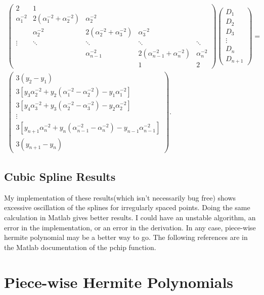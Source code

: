 \documentclass{scrartcl}
\begin{document}
\begin{align}
\left(\begin{array}{ccccc}
2&1\\
  \alpha_1^{-2}&2(\alpha_1^{-2}+\alpha_2^{-2})&\alpha_2^{-2}\\
 &\alpha_2^{-2}&2(\alpha_2^{-2}+\alpha_3^{-2})&\alpha_3^{-2}\\
\vdots&\ddots&\ddots&\ddots&\ddots\\
&&\alpha_{n-1}^{-2}&2(\alpha_{n-1}^{-2}+\alpha_n^{-2})&\alpha_n^{-2}\\
&&&1&2
\end{array}\right)
\left(\begin{array}{c}
D_1\\D_2\\D_3\\ \vdots\\D_n\\D_{n+1}
\end{array}\right) =\\
\left(\begin{array}{c}
3(y_2-y_1)\\
3[y_3\alpha_2^{-2}
	+y_2(\alpha_1^{-2}
	-\alpha_2^{-2})
	-y_1\alpha_1^{-2}]\\
3[y_4\alpha_3^{-2}
	+y_3(\alpha_2^{-2}
	-\alpha_3^{-2})
	-y_2\alpha_2^{-2}]\\
\vdots\\
3[y_{n+1}\alpha_n^{-2}+y_n(\alpha_{n-1}^{-2}
	-\alpha_n^{-2})-y_{n-1}\alpha_{n-1}^{-2}]\\
3(y_{n+1}-y_n)
\end{array}\right).\label{eq:eqtdi}
\end{align}

\subsection{Cubic Spline Results}
My implementation of these results(which isn't necessarily bug free)
shows excessive oscillation of the splines for irregularly spaced
points. Doing the same calculation in Matlab gives better results.
I could have an unstable algorithm, an error in the implementation,
or an error in the derivation. In any case, piece-wise hermite polynomial
may be a better way to go. The following references are in the Matlab
documentation of the pchip function\cite{Fritsch,Kahaner}.

\section{Piece-wise Hermite Polynomials}
\end{document}
